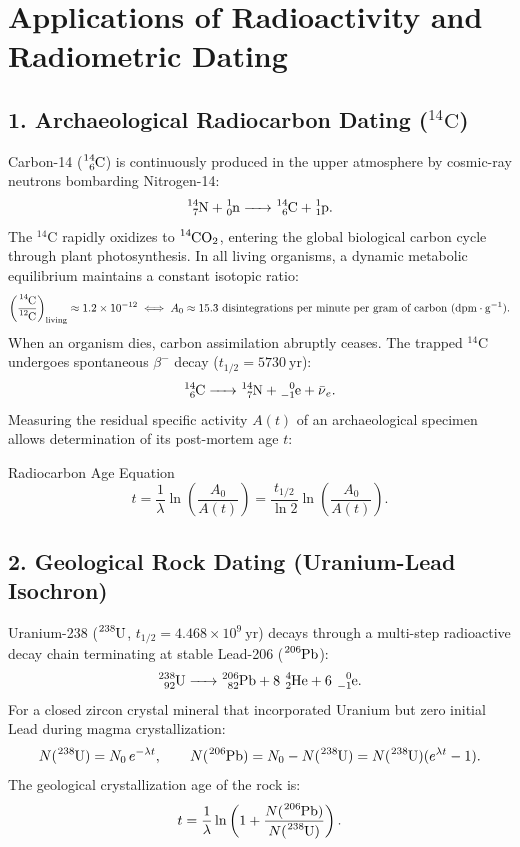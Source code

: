 \section{Applications of Radioactivity and Radiometric Dating}

\subsection{1. Archaeological Radiocarbon Dating ($^{14}\mathrm{C}$)}
Carbon-14 ($\ce{^{14}_6C}$) is continuously produced in the upper atmosphere by cosmic-ray neutrons bombarding Nitrogen-14:
\[
\ce{^{14}_7N + ^1_0n -> ^{14}_6C + ^1_1p}.
\]
The $^{14}\mathrm{C}$ rapidly oxidizes to $\ce{^{14}CO_2}$, entering the global biological carbon cycle through plant photosynthesis. In all living organisms, a dynamic metabolic equilibrium maintains a constant isotopic ratio:
\[
\left(\frac{\ce{^{14}C}}{\ce{^{12}C}}\right)_{\text{living}} \approx 1.2 \times 10^{-12} \iff A_0 \approx 15.3\ \text{disintegrations per minute per gram of carbon}\ (\mathrm{dpm\cdot g^{-1}}).
\]
When an organism dies, carbon assimilation abruptly ceases. The trapped $^{14}\mathrm{C}$ undergoes spontaneous $\beta^-$ decay ($t_{1/2} = 5730\ \mathrm{yr}$):
\[
\ce{^{14}_6C -> ^{14}_7N + ^0_{-1}e + \bar{\nu}_e}.
\]
Measuring the residual specific activity $A(t)$ of an archaeological specimen allows determination of its post-mortem age $t$:

\begin{lawbox}{Radiocarbon Age Equation}
\begin{equation}
t = \frac{1}{\lambda} \ln\left( \frac{A_0}{A(t)} \right) = \frac{t_{1/2}}{\ln 2} \ln\left( \frac{A_0}{A(t)} \right).
\end{equation}
\end{lawbox}

\subsection{2. Geological Rock Dating (Uranium-Lead Isochron)}
Uranium-238 ($\ce{^{238}U}$, $t_{1/2} = 4.468 \times 10^9\ \mathrm{yr}$) decays through a multi-step radioactive decay chain terminating at stable Lead-206 ($\ce{^{206}Pb}$):
\[
\ce{^{238}_{92}U -> ^{206}_{82}Pb + 8\,^4_2He + 6\,^0_{-1}e}.
\]
For a closed zircon crystal mineral that incorporated Uranium but zero initial Lead during magma crystallization:
\[
N(\ce{^{238}U}) = N_0\,e^{-\lambda t}, \qquad N(\ce{^{206}Pb}) = N_0 - N(\ce{^{238}U}) = N(\ce{^{238}U})(e^{\lambda t} - 1).
\]
The geological crystallization age of the rock is:
\begin{equation}
t = \frac{1}{\lambda} \ln\left( 1 + \frac{N(\ce{^{206}Pb})}{N(\ce{^{238}U})} \right).
\end{equation}

